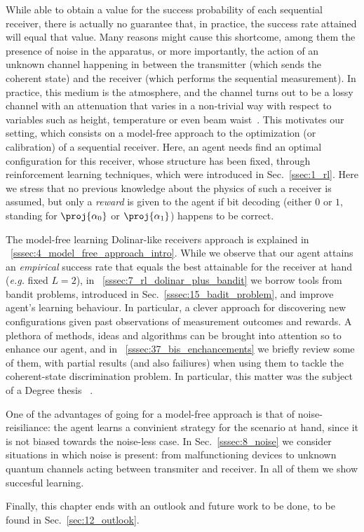 While able to obtain a value for the success probability of each sequential receiver, there is actually no guarantee that, in practice, the success rate attained will equal that value. Many reasons might cause this shortcome, among them the presence of noise in the apparatus, or more importantly, the action of an unknown channel happening in between the transmitter (which sends the coherent state) and the receiver (which performs the sequential measurement). In practice, this medium is the atmosphere, and the channel turns out to be a lossy channel with an attenuation that varies in a non-trivial way with respect to variables such as height, temperature or even beam waist~\cite{pirandola_atmo}. This motivates our setting, which consists on a model-free approach to the optimization (or calibration) of a sequential receiver. Here, an agent needs find an optimal configuration for this receiver, whose structure has been fixed, through reinforcement learning techniques, which were introduced in Sec.~\ref{ssec:1_rl}. Here we stress that no previous knowledge about the physics of such a receiver is assumed, but only a \textit{reward} is given to the agent if bit decoding (either $0$ or $1$, standing for $\proj{\alpha_0}$ or $\proj{\alpha_1}$) happens to be correct.

The model-free learning Dolinar-like receivers approach is explained in ~\ref{sssec:4_model_free_approach_intro}.
While we observe that our agent attains an \textit{empirical} success rate that equals the best attainable for the receiver at hand (\textit{e.g.} fixed $L=2$), in ~\ref{sssec:7_rl_dolinar_plus_bandit} we borrow tools from bandit problems, introduced in Sec.~\ref{sssec:15_badit_problem}, and improve agent's learning behaviour. In particular, a clever approach for discovering new configurations given past observations of measurement outcomes and rewards. A plethora of methods, ideas and algorithms can be brought into attention so to enhance our agent, and in ~\ref{sssec:37_bis_enchancements} we briefly review some of them, with partial results (and also failiures) when using them to tackle the coherent-state discrimination problem. In particular, this matter was the subject of a Degree thesis ~\cite{JoseTFG}.

One of the advantages of going for a model-free approach is that of noise-reisiliance: the agent learns a convinient strategy for the scenario at hand, since it is not biased towards the noise-less case. In Sec.~\ref{sssec:8_noise} we consider situations in which noise is present: from malfunctioning devices to unknown quantum channels acting between transmiter and receiver. In all of them we show succesful learning.

Finally, this chapter ends with an outlook and future work to be done, to be found in Sec.~\ref{sec:12_outlook}.
